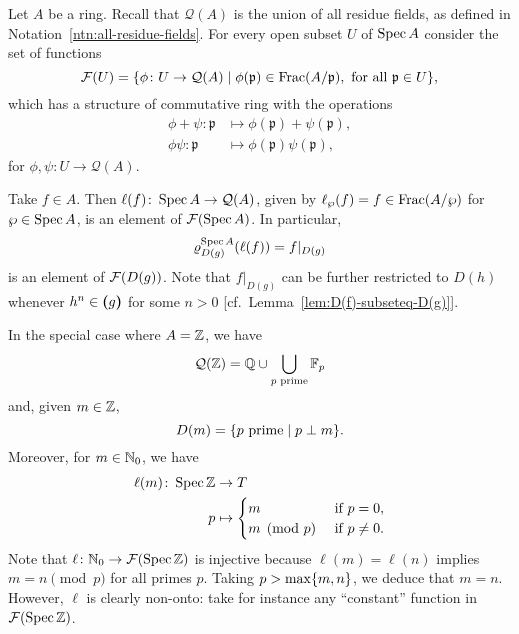 \begin{xmpl}
    Let $A$ be a ring. Recall that $\mathcal Q(A)$ is the union of all residue fields, as defined in Notation~\ref{ntn:all-residue-fields}. For every open subset $U$ of $\operatorname{Spec} A$ consider the set of functions
    $$
        \mathcal{F}(U) = \{\phi\colon U\to\mathcal Q(A)
            \mid\phi(\mathfrak p)\in\operatorname{Frac}(A/\mathfrak p),\text{ for all }
            \mathfrak p\in U\},
    $$
    which has a structure of commutative ring with the operations
    \begin{align*}
        \phi+\psi\colon\mathfrak p &\mapsto\phi(\mathfrak p)+\psi(\mathfrak p),\\
        \phi\psi\colon \mathfrak p &\mapsto\phi(\mathfrak p)\psi(\mathfrak p),
    \end{align*}
    for $\phi,\psi\colon U\to\mathcal Q(A)$.
    
    Take $f\in A$. Then $\ell(f)\colon\operatorname{Spec} A\to\mathcal Q(A)$, given by $\ell_\wp(f)=f\in\operatorname{Frac}(A/\wp)$ for $\wp\in\operatorname{Spec} A$, is an element of $\mathcal{F}(\operatorname{Spec} A)$. In particular,
    $$
        \varrho^{\operatorname{Spec} A}_{D(g)}(\ell(f)) = f|_{D(g)}
    $$
    is an element of $\mathcal{F}(D(g))$. Note that $f|_{D(g)}$ can be further restricted to $D(h)$ whenever $h^n\in\textrm{\boldmath$($}g\textrm{\boldmath$)$}$ for some $n>0$ [cf.~Lemma~\ref{lem:D(f)-subseteq-D(g)}].

    In the special case where $A=\mathbb{Z}$, we have
    $$
        \mathcal Q(\mathbb{Z}) = \mathbb{Q}\cup\bigcup_{p\text{ prime}}\mathbb{F}_p
    $$
    and, given $m\in\mathbb{Z}$,
    $$
        D(m) = \{p\text{ prime}\mid p\perp m\}.
    $$
    Moreover, for $m\in\mathbb{N}_0$, we have
    \begin{align*}
        \ell(m)\colon\operatorname{Spec}\mathbb{Z}&\to T\\
            p&\mapsto
                \begin{cases}
                    m   &\text{ if }p=0,\\
                    m\pmod p    &\text{ if }p\ne0.
                \end{cases}
    \end{align*}
    Note that $\ell\colon\mathbb{N}_0\to\mathcal{F}(\operatorname{Spec}\mathbb{Z})$ is injective because $\ell(m)=\ell(n)$ implies $m=n\pmod p$ for all primes $p$. Taking $p> \max\{m,n\}$, we deduce that $m=n$. However, $\ell$ is clearly non-onto: take for instance any ``constant'' function in $\mathcal{F}(\operatorname{Spec}\mathbb{Z})$.
\end{xmpl}

